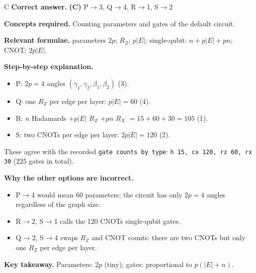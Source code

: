 \documentclass[11pt,a4paper]{article}
\newcommand{\qsep}{\par\vspace{2pt}{\color{black!15}\hrule}\vspace{4pt}}
\begin{document}
\begin{solbox}{C}
\textbf{\color{brand}Correct answer.} \textcolor{okgreen}{\textbf{(C)}} P$\to$3, Q$\to$4, R$\to$1, S$\to$2

\textbf{\color{brand}Concepts required.} Counting parameters and gates of the default circuit.

\textbf{\color{brand}Relevant formulae.} parameters $2p$; $R_Z$: $p|E|$; single-qubit: $n + p|E| + pn$; CNOT: $2p|E|$.

\textbf{\color{brand}Step-by-step explanation.} \begin{itemize}\itemsep0pt
\item P: $2p = 4$ angles $(\gamma_1, \gamma_2, \beta_1, \beta_2)$ (3).
\item Q: one $R_Z$ per edge per layer: $p|E| = 60$ (4).
\item R: $n$ Hadamards $+ p|E|$ $R_Z$ $+ pn$ $R_X$ $= 15 + 60 + 30 = 105$ (1).
\item S: two CNOTs per edge per layer: $2p|E| = 120$ (2).
\end{itemize}
These agree with the recorded \texttt{gate counts by type}: \texttt{h 15, cx 120, rz 60, rx 30} ($225$ gates in total).

\textbf{\color{brand}Why the other options are incorrect.}
\begin{itemize}[leftmargin=2.4em, itemsep=1pt, topsep=2pt]
\item[\textbf{(A)}] P$\to$4 would mean 60 parameters; the circuit has only $2p = 4$ angles regardless of the graph size.
\item[\textbf{(B)}] R$\to$2, S$\to$1 calls the 120 CNOTs single-qubit gates.
\item[\textbf{(D)}] Q$\to$2, S$\to$4 swaps $R_Z$ and CNOT counts: there are two CNOTs but only one $R_Z$ per edge per layer.
\end{itemize}
\textbf{\color{brand}Key takeaway.} Parameters: $2p$ (tiny); gates: proportional to $p(|E| + n)$.
\end{solbox}
\qsep
\end{document}
